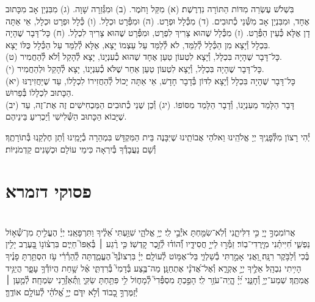 \documentclass[twoside, openany, parskip=half, 11pt]{book}
\begin{document}
בִּשְׁלֹשׁ עֶשְׂרֵה מִדּוֹת הַתּוֹרָה נִדְרֶשֶׁת׃\hfill \break
(א) מִקַּל וָחֹמֶר.\hfill \break
(ב) וּמִגְּ֯זֵרָה שָׁוָה.\hfill \break
(ג) מִבִּנְיַן אָב מִכָּתוּב אֶחָד, וּמִבִּנְיַן אָב מִשְּׁ֯נֵי כְ֯תוּבִים.\hfill \break
(ד) מִכְּ֯לָל וּפְרָט.\hfill \break
(ה) וּמִפְּ֯רָט וּכְלָל.\hfill \break
(ו) כְּ֯לָל וּפְרָט וּכְלָל, אֵי אַתָּה דָן אֶלָּא כְּ֯עֵין הַפְּ֯רָט.\hfill \break
(ז) מִכְּ֯לָל שֶׁהוּא צָרִיךְ לִפְרָט, וּמִפְּ֯רָט שֶׁהוּא צָרִיךְ לִכְלָל.\hfill \break
(ח) כָּל־דָּבָר שֶׁהָיָה בִּכְלָל וְ֯יָצָא מִן הַכְּ֯לָל לְ֯לַמֵּד, לֹא לְ֯לַמֵּד עַל עַצְמוֹ יָצָא, אֶלָּא לְ֯לַמֵּד עַל הַכְּ֯לָל כֻּלּוֹ יָצָא. \\
(ט) כָּל־דָּבָר שֶׁהָיָה בִּכְלָל, וְ֯יָצָא לִטְעוֹן טַעַן אֶחָד שֶׁהוּא כְ֯עִנְיָנוֹ, יָצָא לְ֯הָקֵל וְ֯לֹא לְ֯הַחֲמִיר. \\
(י) כָּל־דָּבָר שֶׁהָיָה בִּכְלָל, וְ֯יָצָא לִטְעוֹן טַעַן אַחֵר שֶׁלֹּא כְ֯עִנְיָנוֹ, יָצָא לְ֯הָקֵל וּלְהַחֲמִיר. \\
(יא) כָּל־דָּבָר שֶׁהָיָה בִּכְלָל וְ֯יָצָא לִדּוֹן בְּ֯דָבָר חָדָשׁ, אֵי אַתָּה יָכוֹל לְ֯הַחֲזִירוֹ לִכְלָלוֹ, עַד שֶׁיַּחֲזִירֶנּוּ הַכָּתוּב לִכְלָלוֹ בְּ֯פֵרוּשׁ. \\
(יב) דָּבָר הַלָּמֵד מֵעִנְיָנוֹ, וְ֯דָבָר הַלָּמֵד מִסּוֹפוֹ.\hfill \break
(יג) וְ֯כֵן שְׁנֵי כְ֯תוּבִים הַמַּכְחִישִׁים זֶה אֶת־זֶה, עַד שֶׁיָּבוֹא הַכָּתוּב הַשְּׁ֯לִישִׁי וְ֯יַכְרִיעַ בֵּינֵיהֶם.

יְ֯הִי רָצוֹן מִלְּ֯פָנֶֽיךָ יְיָ אֱלֹהֵֽינוּ וֵאלֹהֵי אֲבוֹתֵֽינוּ שֶׁיִּבָּנֶה בֵּית הַמִּקְדָּשׁ בִּמְהֵרָה בְ֯יָמֵֽינוּ וְ֯תֵן חֶלְקֵֽנוּ בְּ֯תוֹרָתֶֽךָ׃ וְ֯שָׁם נַעֲבָדְ֯ךָ בְּ֯יִרְאָה כִּימֵי עוֹלָם וּכְשָׁנִים קַדְמֹנִיּוֹת׃


\rabbiskaddish

\chapter[פסוקי דזמרא]{ פסוקי דזמרא }
  \\
אֲרוֹמִמְךָ֣ יְיָ֭ כִּ֣י דִלִּיתָ֑נִי וְ֯לֹֽא־שִׂמַּ֖חְתָּ אֹיְ֯בַ֣י לִֽי׃
יְיָ֥ אֱלֹהָ֑י \hfill שִׁוַּ֥עְתִּי אֵ֝לֶ֗יךָ וַתִּרְפָּאֵֽנִי׃
יְיָ֗ הֶעֱלִ֣יתָ מִן־שְׁ֯א֣וֹל נַפְשִׁ֑י חִ֝יִּיתַ֗נִי מִיׇּֽרְדִי־בֽוֹר׃
זַמְּ֯ר֣וּ לַייָ֣ חֲסִידָ֑יו וְ֯֝הוֹד֗וּ לְ֯זֵ֣כֶר קׇדְשֽׁוֹ׃
כִּ֤י רֶ֨גַע ׀ בְּ֯אַפּוֹ֮ חַיִּ֢ים בִּרְצ֫וֹנ֥וֹ
בָּ֭עֶרֶב יָלִ֥ין בֶּ֗כִי וְ֯לַבֹּ֥קֶר רִנָּֽה׃
וַ֭אֲנִי אָמַ֣רְתִּי בְ֯שַׁלְוִ֑י בַּל־אֶמּ֥וֹט לְ֯עוֹלָֽם׃
יְיָ֗ בִּרְצוֹנְ֯ךָ֮ הֶעֱמַ֢דְתָּה לְֽ֯הַרְ֯רִ֫י עֹ֥ז הִסְתַּ֥רְתָּ פָנֶ֗יךָ הָיִ֥יתִי נִבְהָֽל׃
אֵלֶ֣יךָ יְיָ֣ אֶקְרָ֑א וְ֯אֶל־אֲ֝דֹנָ֗י אֶתְחַנָּֽן׃
מַה־בֶּ֥צַע בְּ֯דָמִי֮ בְּ֯רִדְתִּ֢י אֶ֫ל שָׁ֥חַת הֲיוֹדְ֯ךָ֥ עָפָ֑ר הֲיַגִּ֥יד אֲמִתֶּֽךָ׃
שְׁמַע־יְיָ֥ וְ֯חׇנֵּ֑נִי יְ֝יָ֗ הֱֽיֵה־עֹזֵ֥ר לִֽי׃
הָפַ֣כְתָּ מִסְפְּ֯דִי֮ לְ֯מָח֢וֹל לִ֥י פִּתַּ֥חְתָּ שַׂקִּ֑י וַֽתְּ֯אַזְּ֯רֵ֥נִי שִׂמְחָֽה׃
לְ֯מַ֤עַן ׀ יְ֯זַמֶּרְךָ֣ כָ֭בוֹד וְ֯לֹ֣א יִדֹּ֑ם יְיָ֥ אֱ֝לֹהַ֗י לְ֯עוֹלָ֥ם אוֹדֶֽךָּ׃\\
\mournerskaddish
\end{document}
